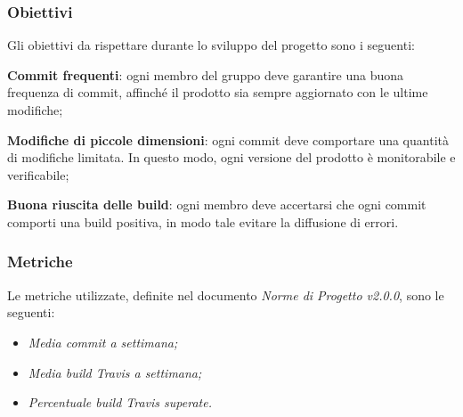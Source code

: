 \subsubsection{Obiettivi} 
Gli obiettivi da rispettare durante lo sviluppo del progetto sono i seguenti:
\begin{itemize}
	\item{\textbf{Commit frequenti}: ogni membro del gruppo deve garantire una buona frequenza di commit, affinché il prodotto sia sempre aggiornato con le ultime modifiche;
	\item{\textbf{Modifiche di piccole dimensioni}: ogni commit deve comportare una quantità di modifiche limitata. In questo modo, ogni versione del prodotto è monitorabile e verificabile;}
	\item{\textbf{Buona riuscita delle build}: ogni membro deve accertarsi che ogni commit comporti una build positiva, in modo tale evitare la diffusione di errori.}
	}
\end{itemize}
\subsubsection{Metriche}
Le metriche utilizzate, definite nel documento \emph{Norme di Progetto v2.0.0}, sono le seguenti:
\begin{itemize}
	\item\emph{Media commit a settimana;}
	\item\emph{Media build Travis a settimana;}
	\item\emph{Percentuale build Travis superate.}
\end{itemize}

